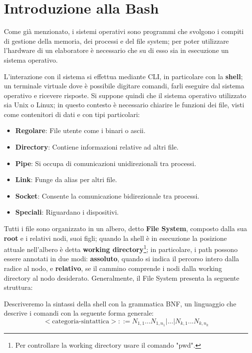 \section{Introduzione alla Bash}
Come già menzionato, i sistemi operativi sono programmi che svolgono i compiti di gestione della memoria, dei processi e del file system; per poter
utilizzare l'hardware di un elaboratore è necessario che su di esso sia in esecuzione un sistema operativo.\par
L'interazione con il sistema si effettua mediante CLI, in particolare con la \textbf{shell}; un terminale virtuale dove è possibile digitare comandi,
farli eseguire dal sistema operativo e ricevere risposte. Si suppone quindi che il sistema operativo utilizzato sia Unix o Linux; in questo contesto è
necessario chiarire le funzioni dei file, visti come contenitori di dati e con tipi particolari: \begin{itemize}
	\item \textbf{Regolare}: File utente come i binari o ascii.
	\item \textbf{Directory}: Contiene informazioni relative ad altri file.
	\item \textbf{Pipe}: Si occupa di comunicazioni unidirezionali tra processi.
	\item \textbf{Link}: Funge da alias per altri file.
	\item \textbf{Socket}: Consente la comunicazione bidirezionale tra processi.
	\item \textbf{Speciali}: Riguardano i dispositivi.
\end{itemize}

\noindent Tutti i file sono organizzato in un albero, detto \textbf{File System}, composto dalla sua \textbf{root} e i relativi nodi, suoi figli; quando
la shell è in esecuzione la posizione attuale nell'albero è detta \textbf{working directory}\footnote{Per controllare la working directory
usare il comando "pwd".}; in particolare, i path possono essere annotati in due modi: \textbf{assoluto}, quando si indica il percorso intero dalla
radice al nodo, e \textbf{relativo}, se il cammino comprende i nodi dalla working directory al nodo desiderato. Generalmente, il File System presenta
la seguente struttura:

\noindent Descriveremo la sintassi della shell con la grammatica BNF, un linguaggio che descrive i comandi con la seguente forma generale: \[
	<\text{categoria-sintattica}>::= N_{1,1} ... N_{1,n_1} | ... | N_{k,1} ... N_{k, n_k}
\]

